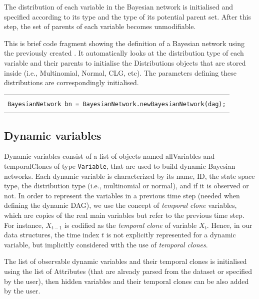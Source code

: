 The distribution of each variable in the Bayesian network is initialised and specified according to its type and the type of its potential parent set. After this step, the set of parents of each variable becomes unmodifiable.

This is brief code fragment showing the definition of a Bayesian network using the previously created . It automatically looks at the distribution type of each variable and their parents to initialise the Distributions objects that are stored inside (i.e., Multinomial, Normal, CLG, etc). The parameters defining these distributions are correspondingly initialised.

\begin{table}[H]
\begin{tabular}{l} \hline\\ 
        \texttt{BayesianNetwork bn = BayesianNetwork.newBayesianNetwork(dag);}\\ \\ \hline 
\end{tabular}
\end{table}      


\subsection{Dynamic variables}

Dynamic variables consist of a list of objects named allVariables and temporalClones of type \texttt{Variable}, that are used to build dynamic Bayesian networks. Each dynamic variable is characterized by its name, ID, the state space type, the distribution type (i.e., multinomial or normal), and if it is observed or not. In order to represent the variables in a previous time step (needed when defining the dynamic DAG), we use the concept of \textit{temporal clone} variables, which are copies of the real main variables but refer to the previous time step. For instance, $X_{t-1}$ is codified as the \textit{temporal clone} of variable $X_t$. Hence, in our data structures, the time index $t$ is not explicitly represented for a dynamic variable, but implicitly considered with the use of \textit{temporal clones}.

The list of observable dynamic variables and their temporal clones is initialised using the list of Attributes (that are already parsed from the dataset or specified by the user), then hidden variables and their temporal clones can be also added by the user.

